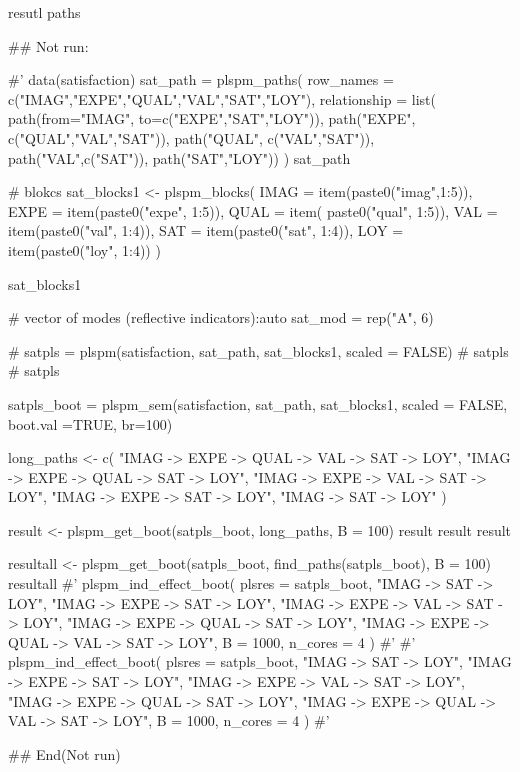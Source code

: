 \documentclass[a4paper]{book}
\begin{document}
%
\begin{Value}
resutl paths
\end{Value}
%
\begin{Examples}
\begin{ExampleCode}

## Not run: 

#'
data(satisfaction)
sat_path = plspm_paths(
  row_names = c("IMAG","EXPE","QUAL","VAL","SAT","LOY"),
  relationship = list(
    path(from="IMAG", to=c("EXPE","SAT","LOY")),
    path("EXPE", c("QUAL","VAL","SAT")),
    path("QUAL", c("VAL","SAT")),
    path("VAL",c("SAT")),
    path("SAT","LOY"))
)
sat_path

# blokcs
sat_blocks1 <- plspm_blocks(
  IMAG = item(paste0("imag",1:5)),
  EXPE = item(paste0("expe", 1:5)),
  QUAL = item( paste0("qual", 1:5)),
  VAL = item(paste0("val", 1:4)),
  SAT = item(paste0("sat", 1:4)),
  LOY = item(paste0("loy", 1:4))
)

sat_blocks1

# vector of modes (reflective indicators):auto
sat_mod = rep("A", 6)

# satpls = plspm(satisfaction, sat_path, sat_blocks1, scaled = FALSE)
# satpls
# satpls %

satpls_boot = plspm_sem(satisfaction, sat_path, sat_blocks1, scaled = FALSE,
                        boot.val =TRUE, br=100)


long_paths <- c(
  "IMAG -> EXPE -> QUAL -> VAL -> SAT -> LOY",
  "IMAG -> EXPE -> QUAL -> SAT -> LOY",
  "IMAG -> EXPE -> VAL -> SAT -> LOY",
  "IMAG -> EXPE -> SAT -> LOY",
  "IMAG -> SAT -> LOY"
)

result <- plspm_get_boot(satpls_boot, long_paths, B = 100)
result
result %
result %

resultall <- plspm_get_boot(satpls_boot, find_paths(satpls_boot), B = 100)
resultall
#'
plspm_ind_effect_boot(
  plsres = satpls_boot,
  "IMAG -> SAT -> LOY",
  "IMAG -> EXPE -> SAT -> LOY",
  "IMAG -> EXPE -> VAL -> SAT -> LOY",
  "IMAG -> EXPE -> QUAL -> SAT -> LOY",
  "IMAG -> EXPE -> QUAL -> VAL -> SAT -> LOY",
  B = 1000,
  n_cores = 4
)%
#'
#'
plspm_ind_effect_boot(
  plsres = satpls_boot,
  "IMAG -> SAT -> LOY",
  "IMAG -> EXPE -> SAT -> LOY",
  "IMAG -> EXPE -> VAL -> SAT -> LOY",
  "IMAG -> EXPE -> QUAL -> SAT -> LOY",
  "IMAG -> EXPE -> QUAL -> VAL -> SAT -> LOY",
  B = 1000,
  n_cores = 4
)
#'



## End(Not run)




\end{ExampleCode}
\end{Examples}
\end{document}
